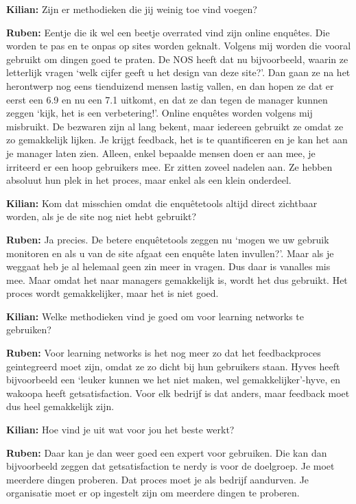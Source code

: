 \textbf{Kilian:} Zijn er methodieken die jij weinig toe vind voegen?

\textbf{Ruben:} Eentje die ik wel een beetje overrated vind zijn online enqu\^etes. Die worden te pas en te onpas op sites worden geknalt. Volgens mij worden die vooral gebruikt om dingen goed te praten. De NOS heeft dat nu bijvoorbeeld, waarin ze letterlijk vragen `welk cijfer geeft u het design van deze site?'. Dan gaan ze na het herontwerp nog eens tienduizend mensen lastig vallen, en dan hopen ze dat er eerst een 6.9 en nu een 7.1 uitkomt, en dat ze dan tegen de manager kunnen zeggen `kijk, het is een verbetering!'. Online enqu\^etes worden volgens mij misbruikt. De bezwaren zijn al lang bekent, maar iedereen gebruikt ze omdat ze zo gemakkelijk lijken. Je krijgt feedback, het is te quantificeren en je kan het aan je manager laten zien. Alleen, enkel bepaalde mensen doen er aan mee, je irriteerd er een hoop gebruikers mee. Er zitten zoveel nadelen aan. Ze hebben absoluut hun plek in het proces, maar enkel als een klein onderdeel.

\textbf{Kilian:} Kom dat misschien omdat die enqu\^etetools altijd direct zichtbaar worden, als je de site nog niet hebt gebruikt?

\textbf{Ruben:} Ja precies. De betere enqu\^etetools zeggen nu `mogen we uw gebruik monitoren en als u van de site afgaat een enqu\^ete laten invullen?'. Maar als je weggaat heb je al helemaal geen zin meer in vragen. Dus daar is vanalles mis mee. Maar omdat het naar managers gemakkelijk is, wordt het dus gebruikt. Het proces wordt gemakkelijker, maar het is niet goed.

\textbf{Kilian:} Welke methodieken vind je goed om voor learning networks te gebruiken?

\textbf{Ruben:} Voor learning networks is het nog meer zo dat het feedbackproces geintegreerd moet zijn, omdat ze zo dicht bij hun gebruikers staan. Hyves heeft bijvoorbeeld een `leuker kunnen we het niet maken, wel gemakkelijker'-hyve, en wakoopa heeft getsatisfaction. Voor elk bedrijf is dat anders, maar feedback moet dus heel gemakkelijk zijn.

\textbf{Kilian:} Hoe vind je uit wat voor jou het beste werkt?

\textbf{Ruben:} Daar kan je dan weer goed een expert voor gebruiken. Die kan dan bijvoorbeeld zeggen dat getsatisfaction te nerdy is voor de doelgroep. Je moet meerdere dingen proberen. Dat proces moet je als bedrijf aandurven. Je organisatie moet er op ingestelt zijn om meerdere dingen te proberen.

